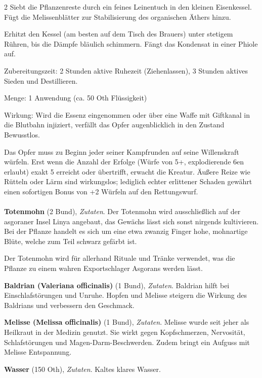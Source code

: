 \begin{multicols}{2}
Siebt die Pflanzenreste durch ein feines Leinentuch in den kleinen Eisenkessel. Fügt die Melissenblätter zur Stabilisierung des organischen Äthers hinzu.

Erhitzt den Kessel (am besten auf dem Tisch des Brauers) unter stetigem Rühren, bis die Dämpfe bläulich schimmern. Fängt das Kondensat in einer Phiole auf.

Zubereitungszeit: 2 Stunden aktive Ruhezeit (Ziehenlassen), 3 Stunden aktives Sieden und Destillieren.

Menge: 1 Anwendung (ca. 50 Oth Flüssigkeit)

Wirkung: Wird die Essenz eingenommen oder über eine Waffe mit Giftkanal in die Blutbahn injiziert, verfällt das Opfer augenblicklich in den Zustand Bewusstlos.

Das Opfer muss zu Beginn jeder seiner Kampfrunden auf seine Willenskraft würfeln. Erst wenn die Anzahl der Erfolge (Würfe von 5+, explodierende 6en erlaubt) exakt 5 erreicht oder übertrifft, erwacht die Kreatur. Äußere Reize wie Rütteln oder Lärm sind wirkungslos; lediglich echter erlittener Schaden gewährt einen sofortigen Bonus von +2 Würfeln auf den Rettungswurf.

    \paragraph{}
    \begin{denseitemize}
        \item \textbf{Totenmohn} (2 Bund), \textit{Zutaten}.
        Der Totenmohn wird ausschließlich auf der asgoraner Insel Linya angebaut, das Gewächs lässt sich sonst nirgends kultivieren. Bei der Pflanze handelt es sich um eine etwa zwanzig Finger hohe, mohnartige Blüte, welche zum Teil schwarz gefärbt ist. 

Der Totenmohn wird für allerhand Rituale und Tränke verwendet, was die Pflanze zu einem wahren Exportschlager Asgorans werden lässt.
        \item \textbf{Baldrian (Valeriana officinalis)} (1 Bund), \textit{Zutaten}.
        Baldrian hilft bei Einschlafstörungen und Unruhe. Hopfen und Melisse steigern die Wirkung des Baldrians und verbessern den Geschmack.
        \item \textbf{Melisse (Melissa officinalis)} (1 Bund), \textit{Zutaten}.
        Melisse wurde seit jeher als Heilkraut in der Medizin genutzt. Sie wirkt gegen Kopfschmerzen, Nervosität, Schlafstörungen und Magen-Darm-Beschwerden. Zudem bringt ein Aufguss mit Melisse Entspannung.
        \item \textbf{Wasser} (150 Oth), \textit{Zutaten}.
        Kaltes klares Wasser.
    \end{denseitemize}



\end{multicols}
